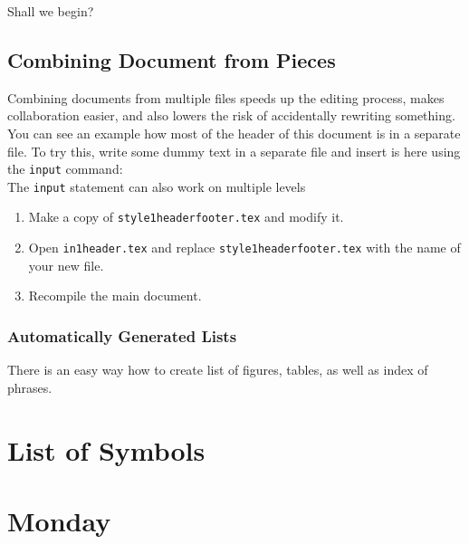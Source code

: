 \documentclass[a4paper,10pt]{report} %
\begin{document}
Shall we begin?

\section{Combining Document from Pieces}
Combining documents from multiple files speeds up the editing process, makes collaboration easier, and also lowers the risk of accidentally rewriting something. You can see an example how most of the header of this document is in a separate file.
To try this, write some dummy text in a separate file and insert is here using the \texttt{input} command:\\
% 

The \texttt{input} statement can also work on multiple levels
\begin{enumerate}
    \item Make a copy of \texttt{style1headerfooter.tex} and modify it.
    \item Open \texttt{in1header.tex} and replace \texttt{style1headerfooter.tex} with the name of your new file.
    \item Recompile the main document.
\end{enumerate}



\subsection{Automatically Generated Lists}\label{sec:automatic}
There is an easy way how to create list of figures, tables, as well as index of phrases. 

%  


  \tableofcontents 
   \label{contents}
   \listoftables  
   \listoffigures
   \newpage 
   \lstlistoflistings
   \label{listings}  
   \chapter*{List of Symbols}
   
\newpage

\chapter{Monday} \label{chap:monday}
 \pagestyle{fancy}
 
\end{document}
